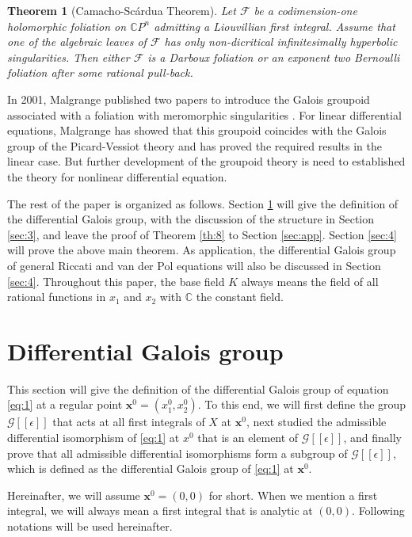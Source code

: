 \documentclass[preprint, 12pt]{elsarticle}
\newtheorem{thm}{Theorem}[section]
\numberwithin{equation}{section}
\newcommand{\Comp}{\mathbb{C}}
\newcommand{\G}{\mathcal{G}}
\begin{document}
\begin{thm}[Camacho-Sc\'{a}rdua Theorem]\cite{Ca:01}
 Let $\mathcal{F}$ be a codimension-one holomorphic foliation on $\mathbb{C}P^n$ admitting a Liouvillian first integral. Assume that one of the algebraic leaves of $\mathcal{F}$ has only non-dicritical infinitesimally hyperbolic singularities. Then either $\mathcal{F}$ is a Darboux foliation or an exponent two Bernoulli foliation after some rational pull-back.
\end{thm}

In 2001, Malgrange published two papers to introduce the
Galois groupoid associated with a foliation with meromorphic
singularities \cite{Ma:01,Ma:02}. For linear differential
equations, Malgrange has showed that this groupoid coincides with the
Galois group of the Picard-Vessiot theory and has proved the required
results in the linear case\cite{Ma:01}. But further development of the
groupoid theory is need to established the theory for nonlinear differential equation\cite{Lor:01}.


The rest of the paper is organized as follows. Section \ref{sec:1} will give the definition of the
differential Galois group, with the discussion of the structure in Section \ref{sec:3}, and leave the proof of Theorem \ref{th:8} to Section \ref{sec:app}. Section \ref{sec:4} will prove the above main theorem. As
application, the differential Galois group of general Riccati and
van der Pol equations will also be discussed in Section \ref{sec:4}. Throughout this paper, 
the base field $K$ always means the field of all
rational functions in $x_1$ and $x_2$ with $\Comp$ the constant field.

\section{Differential Galois group}
\label{sec:1} 
This section will give the definition of the 
differential Galois group of equation \eqref{eq:1} at a
regular point $\mathbf{x}^0 = (x_1^0, x_2^0)$. To this end, we
will first define the group $\G[[\epsilon]]$ that acts at all
first integrals of $X$ at $\mathbf{x}^0$, next studied the
admissible differential isomorphism of \eqref{eq:1} at $x^0$ that
is an element of $\G[[\epsilon]]$, and finally prove that all
admissible differential isomorphisms form a subgroup of
$\G[[\epsilon]]$, which is defined as the
differential Galois group of \eqref{eq:1} at $\mathbf{x}^0$.

Hereinafter, we will assume $\mathbf{x}^0 = (0,0)$ for short. When
we mention a first integral, we will always mean a first integral
that is analytic at $(0,0)$. Following notations will be used
hereinafter. 
\end{document}
